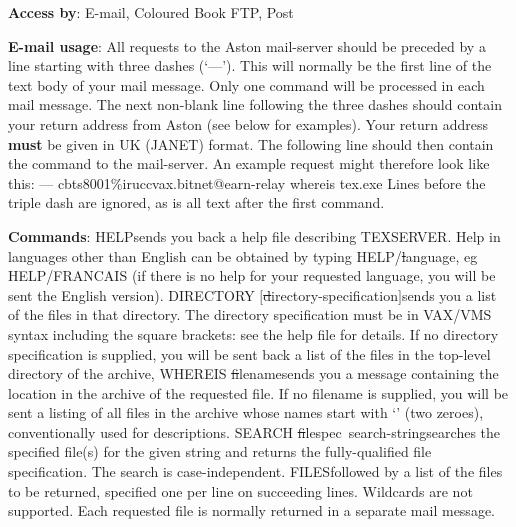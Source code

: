 {\bf Access by}: E-mail, Coloured Book FTP, Post

{\bf E-mail usage}: All requests to the Aston mail-server should be
     preceded by a line starting with three dashes (`{\tx---}'). This
     will normally be the first line of the text body of your mail
     message. Only one command will be processed in each mail message.
     The next non-blank line following the three dashes should contain
     your return address from Aston (see below for examples). Your
     return address {\bf must} be given in UK (JANET) format. The
     following line should then contain the command to the mail-server.
     An example request might therefore look like this:\nl
{\tx ---}\nl
{\tx cbts8001\%iruccvax.bitnet@earn-relay}\nl
{\tx whereis tex.exe}\nl
     Lines before the triple dash are ignored, as is all text after the
     first command.

{\bf Commands}:\nl
{\tx HELP}\quad sends you back a help file describing TEXSERVER. Help in
     languages other than English can be obtained by typing {\tx
     HELP/}{\st language}, eg {\tx HELP/FRANCAIS} (if there is no help
     for your requested language, you will be sent the English
     version).\nl
{\tx DIRECTORY} $[${\st directory-specification}$]$\quad sends you a
     list of the files in that directory. The directory specification
     must be in VAX/VMS syntax including the square brackets: see the
     help file for details. If no directory specification is supplied,
     you will be sent back a list of the files in the top-level
     directory of the archive, {} \nl
{\tx WHEREIS} {\st filename}\quad sends you a message containing the
     location in the archive of the requested file. If no filename is
     supplied, you will be sent a listing of all files in the archive
     whose names start with `{}' (two zeroes), conventionally used
     for descriptions.\nl
{\tx SEARCH} {\st filespec~search-string}\quad searches the specified
     file(s) for the given string and returns the fully-qualified file
     specification. The search is case-independent.\nl
{\tx FILES}\quad followed by a list of the files to be returned,
     specified one per line on succeeding lines. Wildcards are not
     supported. Each requested file is normally returned in a separate
     mail message.

